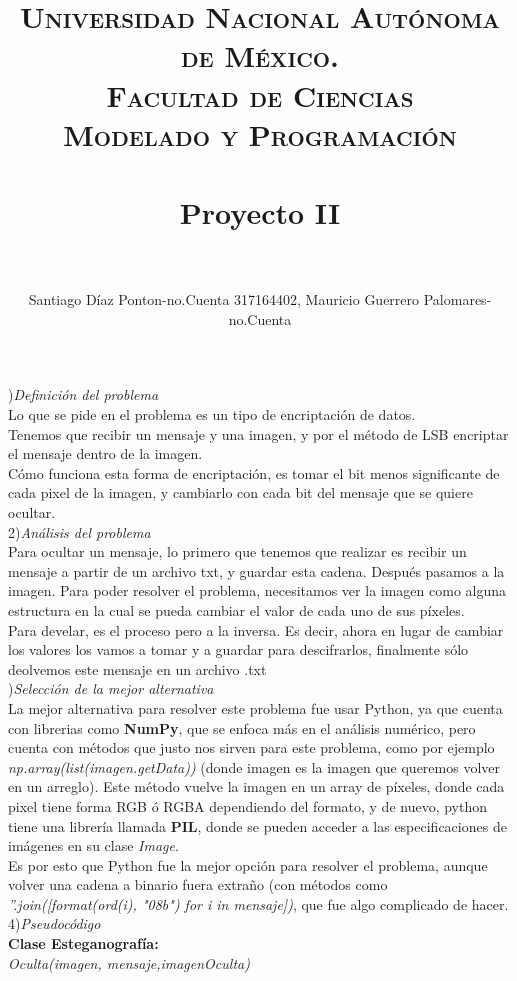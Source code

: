 \documentclass[paper=a4, fontsize=11pt, spanish]{scrartcl}
\title{
  \normalfont \normalsize 
  \textsc{Universidad Nacional Autónoma de México.} \\ [25pt]
  \textsc{Facultad de Ciencias} \\ [20pt]
  \textsc{Modelado y Programación} \\ [15pt]
  \horrule{0.5pt} \\[0.4cm] 
  \huge Proyecto II \\ 
  \horrule{2pt} \\[0.5cm] 
}
\author{Santiago Díaz Ponton-no.Cuenta 317164402, Mauricio Guerrero Palomares-no.Cuenta }
\numberwithin{equation}{section}
\numberwithin{figure}{section}
\numberwithin{table}{section}
\begin{document}
)\textit{Definición del problema}\\
Lo que se pide en el problema es un tipo de encriptación de datos.\\
Tenemos que recibir un mensaje y una imagen, y por el método de LSB encriptar el mensaje dentro de la imagen.\\
Cómo funciona esta forma de encriptación, es tomar el bit menos significante de cada pixel de la imagen, y cambiarlo con cada bit del mensaje que se quiere ocultar.\\

2)\textit{Análisis del problema}\\
Para ocultar un mensaje, lo primero que tenemos que realizar es recibir un mensaje a partir de un archivo txt, y guardar esta cadena. Después pasamos a la imagen. Para poder resolver el problema, necesitamos ver la imagen como alguna estructura en la cual se pueda cambiar el valor de cada uno de sus píxeles.\\
Para develar, es el proceso pero a la inversa. Es decir, ahora en lugar de cambiar los valores los vamos a tomar y a guardar para descifrarlos, finalmente sólo deolvemos este mensaje en un archivo .txt\\
)\textit{Selección de la mejor alternativa}\\
La mejor alternativa para resolver este problema fue usar Python, ya que cuenta con librerias como \textbf{NumPy}, que se enfoca más en el análisis numérico, pero cuenta con métodos que justo nos sirven para este problema, como por ejemplo \textit{np.array(list(imagen.getData))} (donde imagen es la imagen que queremos volver en un arreglo). Este método vuelve la imagen en un array de píxeles, donde cada pixel tiene forma RGB ó RGBA dependiendo del formato, y de nuevo, python tiene una librería llamada \textbf{PIL}, donde se pueden acceder a las especificaciones de imágenes en su clase \textit{Image}. \\
Es por esto que Python fue la mejor opción para resolver el problema, aunque volver una cadena a binario fuera extraño (con métodos como \textit{''.join([format(ord(i), "08b") for i in mensaje])}, que fue algo complicado de hacer.\\
4)\textit{Pseudocódigo}\\
\textbf{Clase Esteganografía:}\\
\textit{Oculta(imagen, mensaje,imagenOculta)}\\
\end{document}
